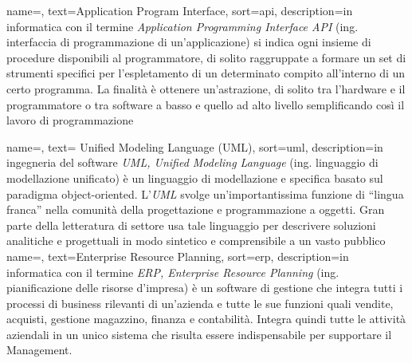 
\renewcommand{\acronymname}{Acronimi e abbreviazioni}





\renewcommand{\glossaryname}{Glossario}

{
	name=,
	text=Application Program Interface,
	sort=api,
	description={in informatica con il termine \emph{Application Programming Interface API} (ing. interfaccia di programmazione di un'applicazione) si indica ogni insieme di procedure disponibili al programmatore, di solito raggruppate a formare un set di strumenti specifici per l'espletamento di un determinato compito all'interno di un certo programma. La finalità è ottenere un'astrazione, di solito tra l'hardware e il programmatore o tra software a basso e quello ad alto livello semplificando così il lavoro di programmazione}
}

{
	name=,
	text= Unified Modeling Language (UML),
	sort=uml,
	description={in ingegneria del software \emph{UML, Unified Modeling Language} (ing. linguaggio di modellazione unificato) è un linguaggio di modellazione e specifica basato sul paradigma object-oriented. L'\emph{UML} svolge un'importantissima funzione di ``lingua franca'' nella comunità della progettazione e programmazione a oggetti. Gran parte della letteratura di settore usa tale linguaggio per descrivere soluzioni analitiche e progettuali in modo sintetico e comprensibile a un vasto pubblico}
}
{
    name=,
    text=Enterprise Resource Planning,
    sort=erp,
    description={in informatica con il termine \emph{ERP, Enterprise Resource Planning} (ing. pianificazione delle risorse d'impresa) è un software di gestione che integra tutti i processi di business rilevanti di un'azienda e tutte le sue funzioni quali vendite, acquisti, gestione magazzino, finanza e contabilità. Integra quindi tutte le attività aziendali in un unico sistema che risulta essere indispensabile per supportare il Management.}
}

